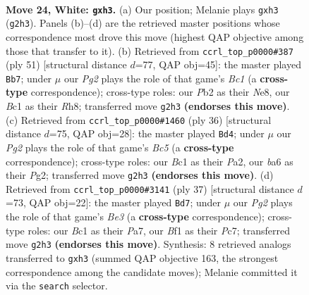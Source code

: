 \documentclass[11pt]{article}
\begin{document}
\clearpage

\begin{figure}[p]\centering
\begin{subfigure}{0.46\textwidth}\centering
\resizebox{\linewidth}{!}{%
\newchessgame
\chessboard[
  setfen={r3k2r/5p2/b4n2/p2pp3/7p/7p/PP1K1PP1/R1B2B1R w kq - 0 24},
  showmover=false,
  pgfstyle=straightmove, color=movearrow, markmove={g2-h3}
]}
\caption{}
\end{subfigure}\hfill
\begin{subfigure}{0.46\textwidth}\centering
\resizebox{\linewidth}{!}{%
\newchessgame
\chessboard[
  setfen={r1b1nk1r/5p2/p6p/1p1p1B2/5P2/2P3N1/PP3R1P/3R3K b - - 0 26},
  showmover=false,
  pgfstyle=straightmove, color=movearrow, markmove={c8-b7}
]}
\caption{}
\end{subfigure}
\\[4pt]
\begin{subfigure}{0.46\textwidth}\centering
\resizebox{\linewidth}{!}{%
\newchessgame
\chessboard[
  setfen={r3k2r/pp2b1pp/2p1p3/2B5/4PR2/8/PPP3PP/R5K1 w kq - 0 19},
  showmover=false,
  pgfstyle=straightmove, color=movearrow, markmove={c5-d4}
]}
\caption{}
\end{subfigure}\hfill
\begin{subfigure}{0.46\textwidth}\centering
\resizebox{\linewidth}{!}{%
\newchessgame
\chessboard[
  setfen={r6r/ppp2k2/2p1bp2/8/3N1BPb/5P2/PPP5/R2R2K1 b - - 4 19},
  showmover=false,
  pgfstyle=straightmove, color=movearrow, markmove={e6-d7}
]}
\caption{}
\end{subfigure}
\caption{\textbf{Move 24, White: \texttt{gxh3}.} (a) Our position; Melanie plays \texttt{gxh3} (\texttt{g2h3}). Panels (b)--(d) are the retrieved master positions whose correspondence most drove this move (highest QAP objective among those that transfer to it). (b) Retrieved from \texttt{ccrl\_top\_p0000\#387} (ply 51) [structural distance $d$=77, QAP obj=45]: the master played \texttt{Bb7}; under $\mu$ our \emph{Pg2} plays the role of that game's \emph{Bc1} (a \textbf{cross-type} correspondence); cross-type roles: our \emph{P}b2 as their \emph{N}e8, our \emph{B}c1 as their \emph{R}h8; transferred move \texttt{g2h3} \textbf{(endorses this move)}. (c) Retrieved from \texttt{ccrl\_top\_p0000\#1460} (ply 36) [structural distance $d$=75, QAP obj=28]: the master played \texttt{Bd4}; under $\mu$ our \emph{Pg2} plays the role of that game's \emph{Bc5} (a \textbf{cross-type} correspondence); cross-type roles: our \emph{B}c1 as their \emph{P}a2, our \emph{b}a6 as their \emph{P}g2; transferred move \texttt{g2h3} \textbf{(endorses this move)}. (d) Retrieved from \texttt{ccrl\_top\_p0000\#3141} (ply 37) [structural distance $d$=73, QAP obj=22]: the master played \texttt{Bd7}; under $\mu$ our \emph{Pg2} plays the role of that game's \emph{Be3} (a \textbf{cross-type} correspondence); cross-type roles: our \emph{B}c1 as their \emph{P}a7, our \emph{B}f1 as their \emph{P}c7; transferred move \texttt{g2h3} \textbf{(endorses this move)}. Synthesis: 8 retrieved analogs transferred to \texttt{gxh3} (summed QAP objective 163, the strongest correspondence among the candidate moves); Melanie committed it via the \texttt{search} selector.}
\label{fig:thought-m46}
\end{figure}
\end{document}
